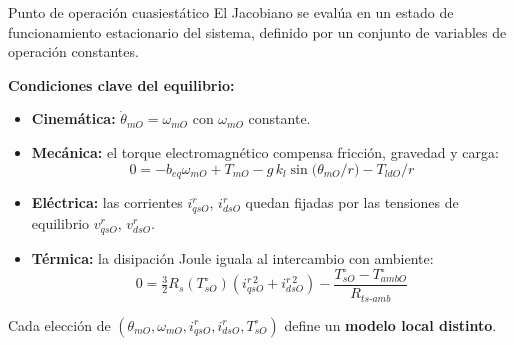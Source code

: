 \documentclass[aspectratio=169,t]{beamer}
\begin{document}
\begin{frame}{Punto de operación cuasiestático}
{\small\color{uncGray}El Jacobiano se evalúa en un estado de funcionamiento estacionario del sistema, definido por un conjunto de variables de operación constantes.}\par
\vspace{3mm}

\textbf{Condiciones clave del equilibrio:}
\begin{itemize}
  \item \textbf{Cinemática:} $\dot{\theta}_{mO}=\omega_{mO}$ con $\omega_{mO}$ constante.
  \item \textbf{Mecánica:} el torque electromagnético compensa fricción, gravedad y carga:
  \[
  0=-b_{eq}\omega_{mO}+T_{mO}-g\,k_l\sin\!\big(\theta_{mO}/r\big)-T_{ldO}/r
  \]
  \item \textbf{Eléctrica:} las corrientes $i_{qsO}^r$, $i_{dsO}^r$ quedan fijadas por las tensiones de equilibrio $v_{qsO}^r$, $v_{dsO}^r$.
  \item \textbf{Térmica:} la disipación Joule iguala al intercambio con ambiente:
  \[
  0=\tfrac{3}{2}R_s(T_{sO}^\circ)\!\left(i_{qsO}^{r\,2}+i_{dsO}^{r\,2}\right)-\frac{T_{sO}^\circ-T_{ambO}^\circ}{R_{ts\text{-}amb}}
  \]
\end{itemize}

{\small Cada elección de $(\theta_{mO},\omega_{mO},i_{qsO}^r,i_{dsO}^r,T_{sO}^\circ)$ define un \textbf{modelo local distinto}.}
\end{frame}
\end{document}
